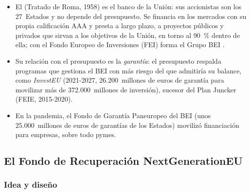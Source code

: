 \documentclass[11pt]{article}
\begin{document}
\begin{itemize}
\item El  (Tratado de Roma, 1958) es el banco de la Unión: sus accionistas son los 27~Estados y no depende del presupuesto. Se financia en los mercados con su propia calificación AAA y presta a largo plazo, a proyectos públicos y privados que sirvan a los objetivos de la Unión, en torno al 90~\% dentro de ella; con el Fondo Europeo de Inversiones (FEI) forma el Grupo BEI .
\item Su relación con el presupuesto es la \emph{garantía}: el presupuesto respalda programas que gestiona el BEI con más riesgo del que admitiría su balance, como \emph{InvestEU} (2021-2027, 26.200~millones de euros de garantía para movilizar más de 372.000~millones de inversión), sucesor del Plan Juncker (FEIE, 2015-2020)\nocite{CE2026InvestEU}.
\item En la pandemia, el Fondo de Garantía Paneuropeo del BEI (unos 25.000~millones de euros de garantías de los Estados) movilizó financiación para empresas, sobre todo pymes.
\end{itemize}

\subsection{El Fondo de Recuperación NextGenerationEU}\label{sec:ngeu}

\subsubsection{Idea y diseño}\label{sec:ngeu-idea}
\end{document}
